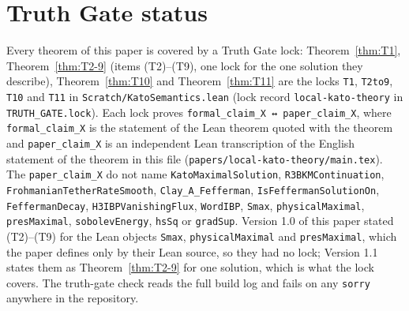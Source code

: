 \documentclass[11pt]{article}
\newcommand{\lean}[1]{\texttt{#1}}
\theoremstyle{definition}
\theoremstyle{remark}
\begin{document}
\section{Truth Gate status}
\label{sec:gate}
Every theorem of this paper is covered by a Truth Gate lock: Theorem~\ref{thm:T1}, Theorem~\ref{thm:T2-9} (items (T2)--(T9), one lock for the one solution they describe), Theorem~\ref{thm:T10} and Theorem~\ref{thm:T11} are the locks \lean{T1}, \lean{T2to9}, \lean{T10} and \lean{T11} in \lean{Scratch/KatoSemantics.lean} (lock record \lean{local-kato-theory} in \lean{TRUTH\_GATE.lock}). Each lock proves \lean{formal\_claim\_X ↔ paper\_claim\_X}, where \lean{formal\_claim\_X} is the statement of the Lean theorem quoted with the theorem and \lean{paper\_claim\_X} is an independent Lean transcription of the English statement of the theorem in this file (\lean{papers/local-kato-theory/main.tex}). The \lean{paper\_claim\_X} do not name \lean{KatoMaximalSolution}, \lean{R3BKMContinuation}, \lean{FrohmanianTetherRateSmooth}, \lean{Clay\_A\_Fefferman}, \lean{IsFeffermanSolutionOn}, \lean{FeffermanDecay}, \lean{H3IBPVanishingFlux}, \lean{WordIBP}, \lean{Smax}, \lean{physicalMaximal}, \lean{presMaximal}, \lean{sobolevEnergy}, \lean{hsSq} or \lean{gradSup}. Version 1.0 of this paper stated (T2)--(T9) for the Lean objects \lean{Smax}, \lean{physicalMaximal} and \lean{presMaximal}, which the paper defines only by their Lean source, so they had no lock; Version 1.1 states them as Theorem~\ref{thm:T2-9} for one solution, which is what the lock covers. The truth-gate check reads the full build log and fails on any \lean{sorry} anywhere in the repository.
\end{document}
